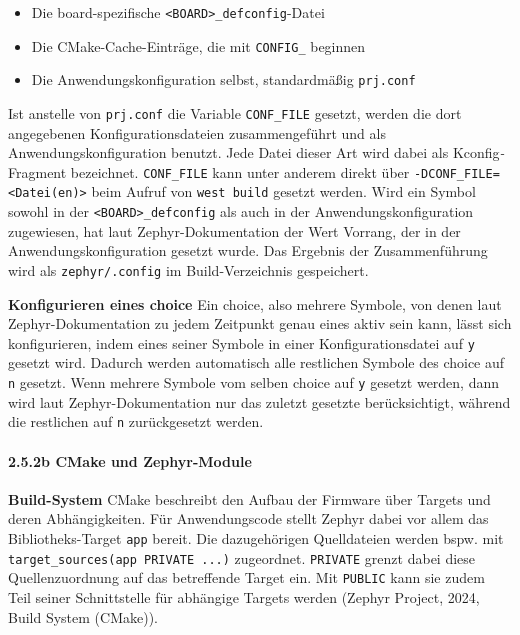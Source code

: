 \begin{itemize}
\item Die board-spezifische \lstinline[style=fileinline]|<BOARD>_defconfig|-Datei
\item Die CMake-Cache-Eintr{\"a}ge, die mit \lstinline[style=fileinline]|CONFIG_| beginnen
\item Die Anwendungskonfiguration selbst, standardm{\"a}{\ss}ig \lstinline[style=fileinline]|prj.conf|
\end{itemize}
Ist anstelle von \lstinline[style=fileinline]|prj.conf| die Variable \lstinline[style=fileinline]|CONF_FILE| gesetzt, werden die dort angegebenen Konfigurationsdateien zusammengef{\"u}hrt und als Anwendungskonfiguration benutzt. Jede Datei dieser Art wird dabei als \glqq{}Kconfig\emph{-}Fragment\grqq{} bezeichnet. \lstinline[style=fileinline]|CONF_FILE| kann unter anderem direkt {\"u}ber \lstinline[style=fileinline]|-DCONF_FILE=<Datei(en)>| beim Aufruf von \lstinline[style=fileinline]|west build| gesetzt werden. Wird ein Symbol sowohl in der \lstinline[style=fileinline]|<BOARD>_defconfig| als auch in der Anwendungskonfiguration zugewiesen, hat laut Zephyr-Dokumentation der  Wert Vorrang, der in der Anwendungskonfiguration gesetzt wurde. Das Ergebnis der Zusammenf{\"u}hrung wird als \lstinline[style=fileinline]|zephyr/.config| im Build-Verzeichnis gespeichert.

\textbf{Konfigurieren eines choice} Ein choice, also mehrere Symbole, von denen laut Zephyr-Dokumentation zu jedem Zeitpunkt genau eines aktiv sein kann, l{\"a}sst sich konfigurieren, indem eines seiner Symbole in einer Konfigurationsdatei auf \lstinline[style=fileinline]|y| gesetzt wird. Dadurch werden automatisch alle restlichen Symbole des choice auf \lstinline[style=fileinline]|n| gesetzt. Wenn mehrere Symbole vom selben choice auf \lstinline[style=fileinline]|y| gesetzt werden, dann wird laut Zephyr-Dokumentation nur das zuletzt gesetzte ber{\"u}cksichtigt, w{\"a}hrend die restlichen auf \lstinline[style=fileinline]|n| zur{\"u}ckgesetzt werden.

\paragraph*{\textbf{2.5.2b CMake und Zephyr-Module}}
\textbf{Build-System} CMake beschreibt den Aufbau der Firmware {\"u}ber Targets und deren Abh{\"a}ngigkeiten. F{\"u}r Anwendungscode stellt Zephyr dabei vor allem das Bibliotheks-Target \lstinline[style=fileinline]|app| bereit. Die dazugeh{\"o}rigen Quelldateien werden bspw. mit \lstinline[style=fileinline]|target_sources(app PRIVATE ...)| zugeordnet. \lstinline[style=fileinline]|PRIVATE| grenzt dabei diese Quellenzuordnung auf das betreffende Target ein. Mit \lstinline[style=fileinline]|PUBLIC| kann sie zudem Teil seiner Schnittstelle f{\"u}r abh{\"a}ngige Targets werden (Zephyr Project, 2024, \glqq{}Build System (CMake)\grqq{}).

